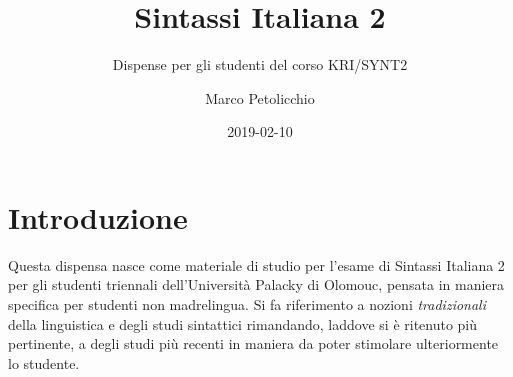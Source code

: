 \documentclass[a4paper,twoside,11pt,chapterprefix=false,bibliography=totocnumbered,listof=flat]{scrbook}
\title{Sintassi Italiana 2}
\subtitle{Dispense per gli studenti del corso KRI/SYNT2}
\author{Marco Petolicchio}
\date{2019-02-10}
\makeatletter
\newcommand\HUGE{\@setfontsize\Huge{36}{48}}
\makeatother
\begin{document}
\maketitle

\makeatletter
{}
\makeatother
\nopagecolor%
\pagecolor{white}

{
\setcounter{tocdepth}{1}
\tableofcontents
}
\listoftables
\listoffigures
\hypertarget{introduzione}{%
\chapter*{Introduzione}\label{introduzione}}

Questa dispensa nasce come materiale di studio per l'esame di Sintassi
Italiana 2 per gli studenti triennali dell'Università Palacky di
Olomouc, pensata in maniera specifica per studenti non madrelingua. Si
fa riferimento a nozioni \emph{tradizionali} della linguistica e degli
studi sintattici rimandando, laddove si è ritenuto più pertinente, a
degli studi più recenti in maniera da poter stimolare ulteriormente lo
studente.
\end{document}
